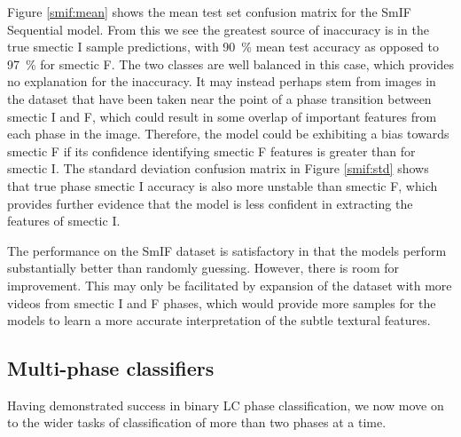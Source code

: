 \documentclass[12pt]{article}
\begin{document}
Figure \ref{smif:mean} shows the mean test set confusion matrix for the SmIF Sequential model. From this we see the greatest source of inaccuracy is in the true smectic I sample predictions, with \SI{90}{\percent} mean test accuracy as opposed to \SI{97}{\percent} for smectic F. The two classes are well balanced in this case, which provides no explanation for the inaccuracy. It may instead perhaps stem from images in the dataset that have been taken near the point of a phase transition between smectic I and F, which could result in some overlap of important features from each phase in the image. Therefore, the model could be exhibiting a bias towards smectic F if its confidence identifying smectic F features is greater than for smectic I. The standard deviation confusion matrix in Figure \ref{smif:std} shows that true phase smectic I accuracy is also more unstable than smectic F, which provides further evidence that the model is less confident in extracting the features of smectic I.

The performance on the SmIF dataset is satisfactory in that the models perform substantially better than randomly guessing. However, there is room for improvement. This may only be facilitated by expansion of the dataset with more videos from smectic I and F phases, which would provide more samples for the models to learn a more accurate interpretation of the subtle textural features.

\subsection{Multi-phase classifiers}
Having demonstrated success in binary LC phase classification, we now move on to the wider tasks of classification of more than two phases at a time.
\end{document}
